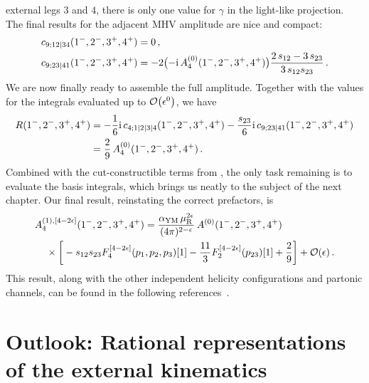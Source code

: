 external legs $3$ and $4$, there is only one value for $\gamma$ in the
light-like projection. The final results for the adjacent MHV amplitude are nice and compact:
\begin{align}
  c_{9;12|34}(1^-,2^-,3^+,4^+) &= 0 \,, \\ 
  c_{9;23|41}(1^-,2^-,3^+,4^+) &= -2 \bigl(-\mathrm{i} \, A^{(0)}_4(1^-,2^-,3^+,4^+)\bigr) \frac{2 \, s_{12} - 3 \, s_{23}}{3 \, s_{12} s_{23}} \,.
\end{align}
We are now finally ready to assemble the full amplitude. Together with the values for the integrals evaluated up to $\mathcal{O}\bigl(\epsilon^0\bigr)$, we have
\begin{align}
  R(1^-,2^-,3^+,4^+)
  &= -\frac{1}{6} \mathrm{i} \, c_{4;1|2|3|4}(1^-,2^-,3^+,4^+) - \frac{s_{23}}{6} \mathrm{i} \, c_{9;23|41}(1^-,2^-,3^+,4^+) \nonumber\\
  &= \frac{2}{9} \, A^{(0)}_4(1^-,2^-,3^+,4^+) \,.
\end{align}
Combined with the cut-constructible terms from , the only task
remaining is to evaluate the basis integrals, which brings us neatly to the
subject of the next chapter. Our final result, reinstating the correct prefactors, is
\begin{align}
\label{eq:full_split_helicity_four_gluon_one_loop_integrand}
\begin{aligned}
  &A^{(1),[4-2\epsilon]}_4(1^-,2^-,3^+,4^+) = \frac{\alpha_{\rm YM} \, \mu_{\rm R}^{2\epsilon}}{(4\pi)^{2-\epsilon}} \, A^{(0)}(1^-,2^-,3^+,4^+) \\
  & \hspace{0.4cm} \times \bigg[-s_{12}s_{23}F_4^{[4-2\epsilon]}(p_1, p_2, p_3)[1] - \frac{11}{3} F_2^{[4-2\epsilon]}(p_{23})[1]  + \frac{2}{9} \bigg] + \mathcal{O}(\epsilon) \,.
\end{aligned}
\end{align}
This result, along with the other independent helicity configurations and partonic channels, can be found in the following references~\cite{ch3_Bern:1990ux,ch3_Bern:1994fz}.

\section{Outlook: Rational representations of the external kinematics \label{sec:3.7}}

